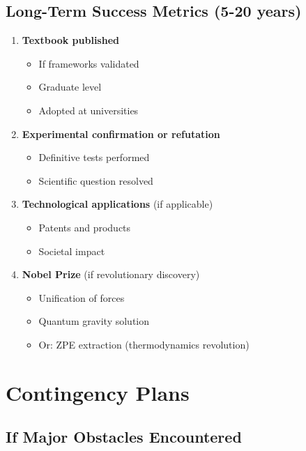 \subsection{Long-Term Success Metrics (5-20 years)}

\begin{enumerate}
    \item \textbf{Textbook published}
    \begin{itemize}
        \item If frameworks validated
        \item Graduate level
        \item Adopted at universities
    \end{itemize}

    \item \textbf{Experimental confirmation or refutation}
    \begin{itemize}
        \item Definitive tests performed
        \item Scientific question resolved
    \end{itemize}

    \item \textbf{Technological applications} (if applicable)
    \begin{itemize}
        \item Patents and products
        \item Societal impact
    \end{itemize}

    \item \textbf{Nobel Prize} (if revolutionary discovery)
    \begin{itemize}
        \item Unification of forces
        \item Quantum gravity solution
        \item Or: ZPE extraction (thermodynamics revolution)
    \end{itemize}
\end{enumerate}

\section{Contingency Plans}

\subsection{If Major Obstacles Encountered}

